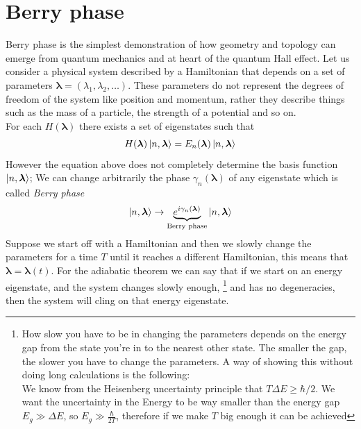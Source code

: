 \section{Berry phase}
    Berry phase is the simplest demonstration of how geometry and topology can emerge from quantum mechanics and at heart of the quantum Hall effect.\newline
    Let us consider a physical system described by a Hamiltonian that depends on a set of parameters $\boldsymbol \lambda=(\lambda_1,\lambda_2,\dots)$. These parameters do not represent the degrees of freedom of the system like position and momentum, rather they describe things such as the mass of a particle, the strength of a potential and so on.\\ For each $H(\boldsymbol \lambda)$ there exists a set of eigenstates such that 
    \begin{equation}
        H(\boldsymbol \lambda)\ket{n,\boldsymbol \lambda}=E_n(\boldsymbol \lambda)\ket{n,\boldsymbol \lambda}
    \end{equation}
    However the equation above does not completely determine the basis function $\ket{n,\boldsymbol \lambda}$; We can change arbitrarily the phase $\gamma_n(\boldsymbol \lambda)$ of any eigenstate which is called \textit{Berry phase}
    \begin{equation}
        \label{eq:berryphase}
        \ket{n,\boldsymbol \lambda}\to \underbrace{e^{i\gamma_n(\boldsymbol \lambda)}}_{\textrm{Berry phase}} \ket{n,\boldsymbol \lambda}  
    \end{equation}
    Suppose we start off with a Hamiltonian and then we slowly change the parameters for a time $T$ until it reaches a different Hamiltonian, this means that $\boldsymbol \lambda=\boldsymbol \lambda(t)$. For the adiabatic theorem we can say that if we start on an energy eigenstate, and the system changes slowly enough,
    \footnote{How slow you have to be in changing the parameters depends on the energy gap from the state you're in to the nearest other state. The smaller the gap, the slower you have to change the parameters. A way of showing this without doing long calculations is the following: \\ We know from the Heisenberg uncertainty principle that $T \Delta E \ge \hbar/2$. We want the uncertainty in the Energy to be way smaller than the energy gap $E_g \gg\Delta E$, so $E_g \gg \frac{\hbar}{2T}$, therefore if we make $T$ big enough it can be achieved}
    and has no degeneracies, then the system will cling on that energy eigenstate.\newline
